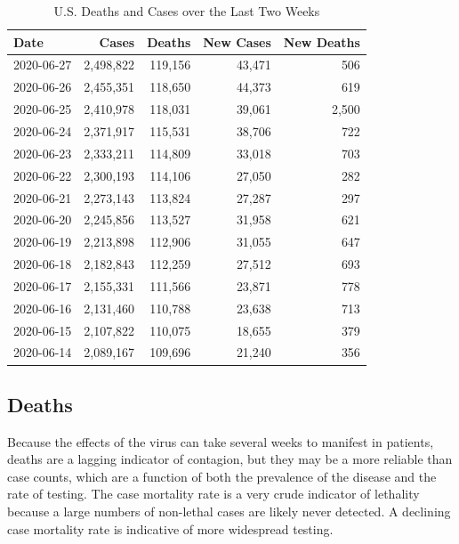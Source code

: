 \documentclass[]{article}
\begin{document}
\begin{table}[!h]

\caption{\label{tab:unnamed-chunk-8}U.S. Deaths and Cases over the Last Two Weeks}
\centering
\begin{tabular}{l|r|r|r|r}
\hline
Date & Cases & Deaths & New Cases & New Deaths\\
\hline
2020-06-27 & 2,498,822 & 119,156 & 43,471 & 506\\
\hline
2020-06-26 & 2,455,351 & 118,650 & 44,373 & 619\\
\hline
2020-06-25 & 2,410,978 & 118,031 & 39,061 & 2,500\\
\hline
2020-06-24 & 2,371,917 & 115,531 & 38,706 & 722\\
\hline
2020-06-23 & 2,333,211 & 114,809 & 33,018 & 703\\
\hline
2020-06-22 & 2,300,193 & 114,106 & 27,050 & 282\\
\hline
2020-06-21 & 2,273,143 & 113,824 & 27,287 & 297\\
\hline
2020-06-20 & 2,245,856 & 113,527 & 31,958 & 621\\
\hline
2020-06-19 & 2,213,898 & 112,906 & 31,055 & 647\\
\hline
2020-06-18 & 2,182,843 & 112,259 & 27,512 & 693\\
\hline
2020-06-17 & 2,155,331 & 111,566 & 23,871 & 778\\
\hline
2020-06-16 & 2,131,460 & 110,788 & 23,638 & 713\\
\hline
2020-06-15 & 2,107,822 & 110,075 & 18,655 & 379\\
\hline
2020-06-14 & 2,089,167 & 109,696 & 21,240 & 356\\
\hline
\end{tabular}
\end{table}

\newpage

\hypertarget{deaths}{%
\subsection{Deaths}\label{deaths}}

Because the effects of the virus can take several weeks to manifest in
patients, deaths are a lagging indicator of contagion, but they may be a
more reliable than case counts, which are a function of both the
prevalence of the disease and the rate of testing. The case mortality
rate is a very crude indicator of lethality because a large numbers of
non-lethal cases are likely never detected. A declining case mortality
rate is indicative of more widespread testing.
\end{document}

